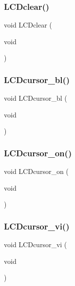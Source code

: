 \subsubsection{L\+C\+Dclear()}
{\footnotesize\ttfamily void L\+C\+Dclear (\begin{DoxyParamCaption}\item[{void}]{ }\end{DoxyParamCaption})}

\mbox{\label{lcd_8c_afdd0a6f1ec6a096553bf3172c0a8eb53}} 
\subsubsection{L\+C\+Dcursor\+\_\+bl()}
{\footnotesize\ttfamily void L\+C\+Dcursor\+\_\+bl (\begin{DoxyParamCaption}\item[{void}]{ }\end{DoxyParamCaption})}

\mbox{\label{lcd_8c_a7a7b0f766f8bcc06b5b9e444ba9361b7}} 
\subsubsection{L\+C\+Dcursor\+\_\+on()}
{\footnotesize\ttfamily void L\+C\+Dcursor\+\_\+on (\begin{DoxyParamCaption}\item[{void}]{ }\end{DoxyParamCaption})}

\mbox{\label{lcd_8c_a99bb73b2e5d4688dbf86f2d5aaa87484}} 
\subsubsection{L\+C\+Dcursor\+\_\+vi()}
{\footnotesize\ttfamily void L\+C\+Dcursor\+\_\+vi (\begin{DoxyParamCaption}\item[{void}]{ }\end{DoxyParamCaption})}

\mbox{\label{lcd_8c_ae52e7cbae1b62045eb7c97e0751da460}} 
